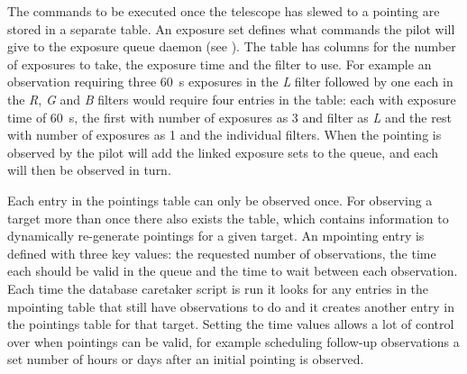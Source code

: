 \begin{colsection}
\begin{colsection}
The commands to be executed once the telescope has slewed to a pointing are stored in a separate  table. An exposure set defines what commands the pilot will give to the exposure queue daemon (see ). The table has columns for the number of exposures to take, the exposure time and the filter to use. For example an observation requiring three \SI{60}{\second} exposures in the \textit{L} filter followed by one each in the \textit{R}, \textit{G} and \textit{B} filters would require four entries in the table: each with exposure time of \SI{60}{\second}, the first with number of exposures as 3 and filter as \textit{L} and the rest with number of exposures as 1 and the individual filters. When the pointing is observed by the pilot will add the linked exposure sets to the queue, and each will then be observed in turn.

Each entry in the pointings table can only be observed once. For observing a target more than once there also exists the  table, which contains information to dynamically re-generate pointings for a given target. An mpointing entry is defined with three key values: the requested number of observations, the time each should be valid in the queue and the time to wait between each observation. Each time the database caretaker script is run it looks for any entries in the mpointing table that still have observations to do and it creates another entry in the pointings table for that target. Setting the time values allows a lot of control over when pointings can be valid, for example scheduling follow-up observations a set number of hours or days after an initial pointing is observed.


\end{colsection}
\end{colsection}
